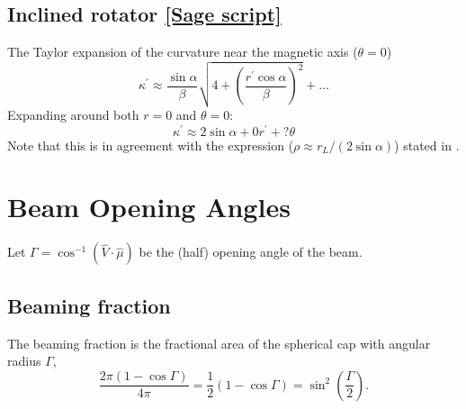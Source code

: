 \documentclass{book}
\newcommand{\linktosage}[1]{\hyperref[#1]{[Sage script]}}
\begin{document}
\subsection{Inclined rotator \linktosage{sage:curvature}}

The Taylor expansion of the curvature near the magnetic axis ($\theta = 0$)
\begin{equation}
    \kappa^\prime \approx \frac{\sin\alpha}{\beta}\sqrt{4 + \left(\frac{r^\prime\cos\alpha}{\beta}\right)^2} + \dots
\end{equation}
Expanding around both $r = 0$ and $\theta = 0$:
\begin{equation}
   \kappa^\prime \approx 2\sin\alpha + 0r^\prime + ?\theta
\end{equation}
Note that this is in agreement with the expression ($\rho \approx r_L/(2\sin\alpha)$) stated in \citet{Thomas2007}.

\section{Beam Opening Angles}
\label{sec:beamopeningangles}

Let $\Gamma = \cos^{-1}(\hat{V}\cdot\hat{\mu})$ be the (half) opening angle of the beam.

\subsection{Beaming fraction}

The beaming fraction is the fractional area of the spherical cap with angular radius $\Gamma$,
\begin{equation}
    \frac{2\pi(1 - \cos\Gamma)}{4\pi}
        = \frac12 (1 - \cos\Gamma)
        = \sin^2\left(\frac{\Gamma}{2}\right).
\end{equation}
\end{document}
